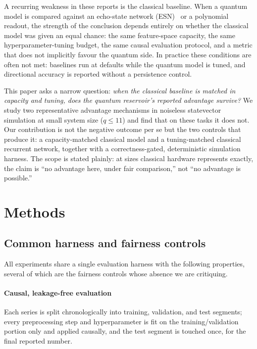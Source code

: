 ﻿\documentclass[10pt,conference]{IEEEtran}
\begin{document}
A recurring weakness in these reports is the classical baseline. When a quantum
model is compared against an echo-state network (ESN)~\cite{jaeger2001} or a
polynomial readout, the strength of the conclusion depends entirely on whether
the classical model was given an equal chance: the same feature-space capacity,
the same hyperparameter-tuning budget, the same causal evaluation protocol, and a
metric that does not implicitly favour the quantum side. In practice these
conditions are often not met: baselines run at defaults while the quantum model
is tuned, and directional accuracy is reported without a persistence control.

This paper asks a narrow question: \emph{when the classical baseline is matched
in capacity and tuning, does the quantum reservoir's reported advantage survive?}
We study two representative advantage mechanisms in noiseless statevector
simulation at small system size ($q\le 11$) and find that on these tasks it does
not. Our contribution is not the negative outcome per se but the two controls
that produce it: a capacity-matched classical model and a tuning-matched
classical recurrent network, together with a correctness-gated, deterministic
simulation harness. The scope is stated plainly: at sizes classical hardware
represents exactly, the claim is ``no advantage here, under fair comparison,''
not ``no advantage is possible.''

\section{Methods}
\label{sec:methods}

\subsection{Common harness and fairness controls}

All experiments share a single evaluation harness with the following properties,
several of which are the fairness controls whose absence we are critiquing.

\paragraph{Causal, leakage-free evaluation} Each series is split chronologically
into training, validation, and test segments; every preprocessing step and
hyperparameter is fit on the training/validation portion only and applied
causally, and the test segment is touched once, for the final reported number.
\end{document}
